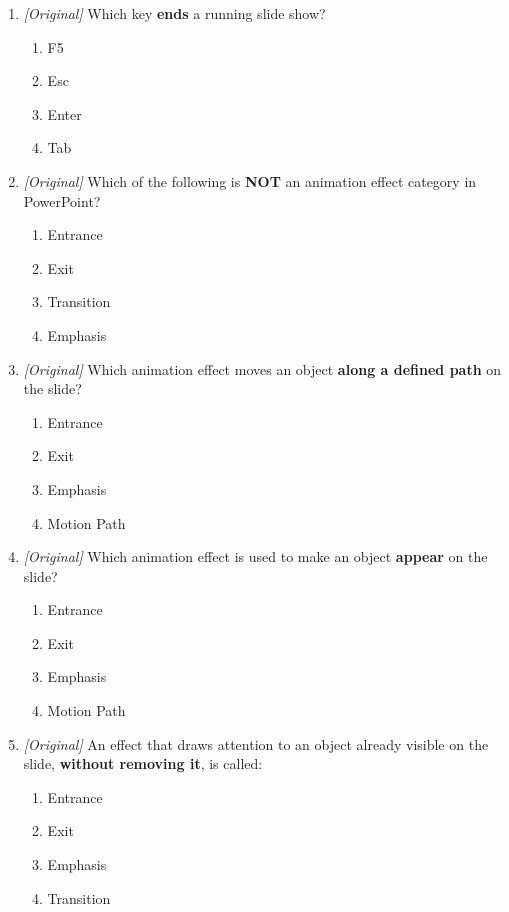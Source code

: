 \begin{enumerate}[label=\textbf{Q\arabic*.}, leftmargin=*]
\begin{enumerate}[label=\Alph*.]
    \item open the Notes pane
  \end{enumerate}
\item \textit{[Original]} Which key \textbf{ends} a running slide show?
  \begin{enumerate}[label=\Alph*.]
    \item F5
    \item Esc
    \item Enter
    \item Tab
  \end{enumerate}
\item \textit{[Original]} Which of the following is \textbf{NOT} an animation
  effect category in PowerPoint?
  \begin{enumerate}[label=\Alph*.]
    \item Entrance
    \item Exit
    \item Transition
    \item Emphasis
  \end{enumerate}
\item \textit{[Original]} Which animation effect moves an object \textbf{along a
  defined path} on the slide?
  \begin{enumerate}[label=\Alph*.]
    \item Entrance
    \item Exit
    \item Emphasis
    \item Motion Path
  \end{enumerate}
\item \textit{[Original]} Which animation effect is used to make an object
  \textbf{appear} on the slide?
  \begin{enumerate}[label=\Alph*.]
    \item Entrance
    \item Exit
    \item Emphasis
    \item Motion Path
  \end{enumerate}
\item \textit{[Original]} An effect that draws attention to an object already
  visible on the slide, \textbf{without removing it}, is called:
  \begin{enumerate}[label=\Alph*.]
    \item Entrance
    \item Exit
    \item Emphasis
    \item Transition

\end{enumerate}
\end{enumerate}
